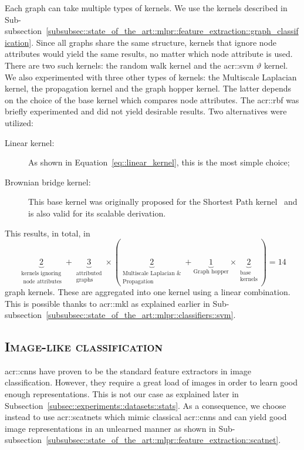         Each graph can take multiple types of kernels.
        We use the kernels described in Sub-subsection~\ref{subsubsec::state_of_the_art::mlpr::feature_extraction::graph_classification}.
        Since all graphs share the same structure, kernels that ignore node attributes would yield the same results, no matter which node attribute is used.
        There are two such kernels: the random walk kernel and the \gls{acr::svm} \(\vartheta\) kernel.
        We also experimented with three other types of kernels: the Multiscale Laplacian kernel, the propagation kernel and the graph hopper kernel.
        The latter depends on the choice of the base kernel which compares node attributes.
        The \gls{acr::rbf} was briefly experimented and did not yield desirable results.
        Two alternatives were utilized:
        \begin{description}
            \item[Linear kernel:] As shown in Equation~\ref{eq::linear_kernel}, this is the most simple choice;
            \item[Brownian bridge kernel:] This base kernel was originally proposed for the Shortest Path kernel~\parencite{borgwardt2005shortest} and is also valid for its scalable derivation.
        \end{description}
        This results, in total, in \begin{equation*}
            \underbrace{2}_{\substack{\text{kernels ignoring}\\\text{ node attributes}}} + \underbrace{3}_{\substack{\text{attributed}\\\text{graphs}}} \times \left(\underbrace{2}_{\substack{\text{Multiscale Laplacian \&}\\\text{Propagation}}} + \underbrace{1}_{\text{Graph hopper}} \times \underbrace{2}_{\substack{\text{base}\\\text{kernels}}}\right) = 14
        \end{equation*} graph kernels.
        These are aggregated into one kernel using a linear combination.
        This is possible thanks to \gls{acr::mkl} as explained earlier in Sub-subsection~\ref{subsubsec::state_of_the_art::mlpr::classifiers::svm}.
        
    \subsection{\textsc{Image-like classification}}
        \label{subsec::learned_evaluation::richer_features::image}
        \glspl{acr::cnn} have proven to be the standard feature extractors in image classification.
        However, they require a great load of images in order to learn good enough representations.
        This is not our case as explained later in Subsection~\ref{subsec::experiments::datasets::stats}.
        As a consequence, we choose instead to use \glspl{acr::scatnet} which mimic classical \glspl{acr::cnn} and can yield good image representations in an unlearned manner as shown in Sub-subsection~\ref{subsubsec::state_of_the_art::mlpr::feature_extraction::scatnet}.


